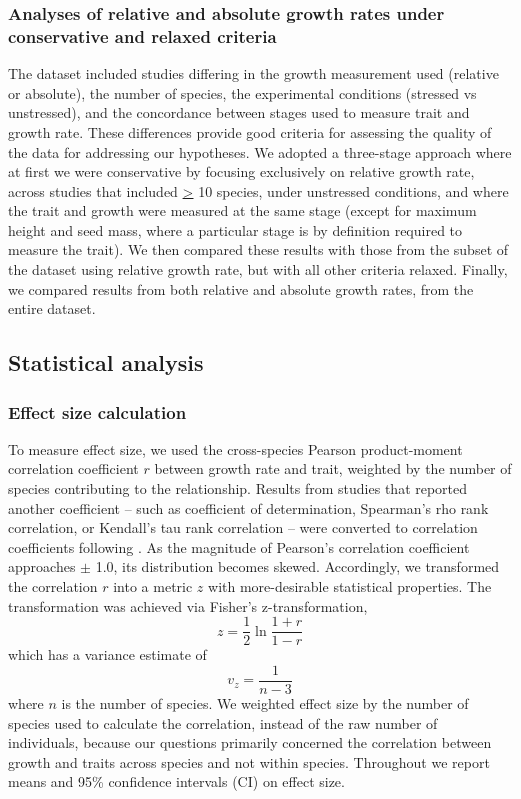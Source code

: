 \documentclass[a4paper,11pt]{article}
\begin{document}
\subsubsection*{Analyses of relative and absolute growth rates under conservative and relaxed criteria}\label{conservative-vs-entire-dataset}

The dataset included studies differing in the growth measurement used (relative or absolute), the number of species, the experimental conditions (stressed vs unstressed), and the concordance between stages used to measure trait and growth rate. These differences provide good criteria for assessing the quality of the data for addressing our hypotheses. We adopted a three-stage approach where at first we were conservative by focusing exclusively on relative growth rate, across studies that included \underline{\textgreater} 10 species, under unstressed conditions, and where the trait and growth were measured at the same stage (except for maximum height and seed mass, where a particular stage is by definition required to measure the trait). We then compared these results with those from the subset of the dataset using relative growth rate, but with all other criteria relaxed. Finally, we compared results from both relative and absolute growth rates, from the entire dataset. 


\subsection*{Statistical analysis}\label{statistical-analyses}

\subsubsection*{Effect size calculation}\label{effect-size}

To measure effect size, we used the cross-species Pearson product-moment correlation coefficient $r$ between growth rate and trait, weighted by the number of species contributing to the relationship. Results from studies that reported another coefficient -- such as coefficient of determination, Spearman's rho rank correlation, or Kendall's tau rank correlation -- were converted to correlation coefficients following \citet{Lajeunesse:2013tm}. As the magnitude of Pearson's correlation coefficient approaches $\pm$ 1.0, its distribution becomes skewed. Accordingly, we transformed the correlation $r$ into a metric $z$ with more-desirable statistical properties. The transformation was achieved via Fisher's z-transformation,
\[ z = \frac{1}{2} \ln \frac{1+r}{1-r}\]
which has a variance estimate of
\[ v_z= \frac{1}{n-3}\]
where $n$ is the number of species. We weighted effect size by the number of species used to calculate the correlation, instead of the raw number of individuals, because our questions primarily concerned the correlation between growth and traits across species and not within species. Throughout we report means and 95\% confidence intervals (CI) on effect size.
\end{document}
